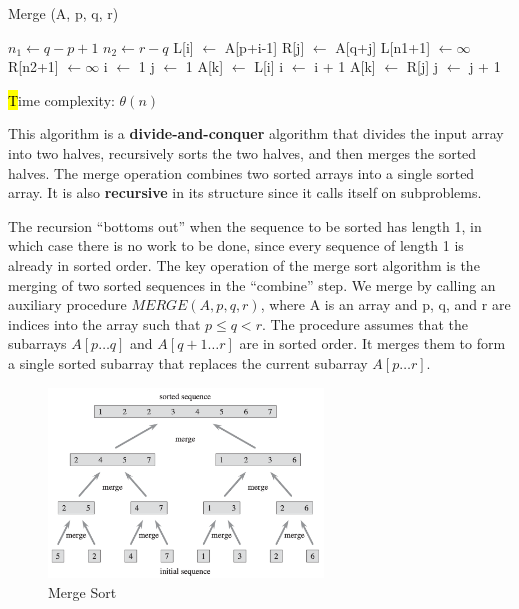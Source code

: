 \begin{algorithm}[H]
    \caption{Merge (A, p, q, r)}
    \begin{algorithmic}[1]
        \State $n_1 \gets q-p+1$
        \State $n_2 \gets r-q$
         
            \State L[i] $\gets$ A[p+i-1]
        \EndFor
            \State R[j] $\gets$ A[q+j]
        \EndFor
        \State L[n1+1] $\gets \infty$
        \State R[n2+1] $\gets \infty$
        \State i $\gets$ 1
        \State j $\gets$ 1
         
                \State A[k] $\gets$ L[i]
                \State i $\gets$ i + 1
            \Else
                \State A[k] $\gets$ R[j]
                \State j $\gets$ j + 1
            \EndIf
        \EndFor
    \end{algorithmic}
    \hl
    Time complexity: $\theta(n)$
\end{algorithm}

\begin{definitionblock}
This algorithm is a \textbf{divide-and-conquer} algorithm that divides the input array into two halves, recursively sorts the two halves, and then merges the sorted halves. The merge operation combines two sorted arrays into a single sorted array. It is also \textbf{recursive} in its structure since it calls itself on subproblems.
\end{definitionblock}

The recursion “bottoms out” when the sequence to be sorted has length 1, in which
case there is no work to be done, since every sequence of length 1 is already in
sorted order.
The key operation of the merge sort algorithm is the merging of two sorted
sequences in the “combine” step. We merge by calling an auxiliary procedure
$MERGE(A,p,q,r)$, where A is an array and p, q, and r are indices into the array
such that $p \leq q < r$. The procedure assumes that the subarrays $A[p\dots q]$ and
$A[q+1 \dots r]$ are in sorted order. It merges them to form a single sorted subarray
that replaces the current subarray $A[p \dots r]$.

\begin{figure}[H]
    \centering
    \includegraphics[width=0.65\textwidth]{assets/merge_sort.png}
    \caption{Merge Sort \cite{cormen2022introduction}}
\end{figure}


